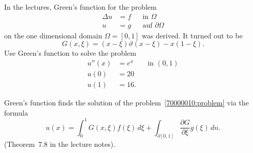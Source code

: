 In the lectures, Green's function for the problem
\[
\begin{aligned}
\Delta u&= f & &\text{in $\Omega$}\\
       u&= g & &\text{auf $\partial\Omega$}
\end{aligned}
\]
on the one dimensional domain
$\Omega=[0,1]$ was derived.
It turned out to be
\[
G(x,\xi) = (x-\xi)\vartheta(x-\xi) -x(1-\xi).
\]
Use Green's function to solve the problem
\[
\begin{aligned}
u''(x)& = e^x& &\text{in $(0,1)$}\\
  u(0)& =  20& &\\
  u(1)& =  16.& &
\end{aligned}
\label{70000010:problem}
\]

\begin{loesung}
Green's function finds the solution of the problem~\eqref{70000010:problem}
via the formula
\begin{equation}
u(x)
=
\int_0^1 G(x,\xi) f(\xi)\,d\xi
+
\int_{\partial[0,1]}\frac{\partial G}{\partial \xi} g(\xi)\,dn.
\label{70000010:green}
\end{equation}
(Theorem~7.8 in the lecture notes). 


\end{loesung}
